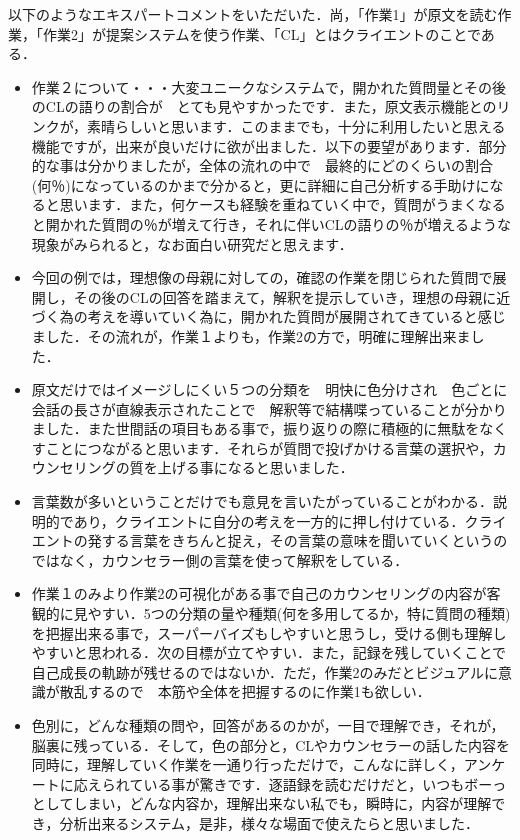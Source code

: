 \documentclass[shuuron]{kuee}
\begin{document}
以下のようなエキスパートコメントをいただいた．尚，「作業1」が原文を読む作業，「作業2」が提案システムを使う作業、「CL」とはクライエントのことである．
\begin{itemize}
  \item 作業２について・・・大変ユニークなシステムで，開かれた質問量とその後のCLの語りの割合が　とても見やすかったです．また，原文表示機能とのリンクが，素晴らしいと思います．このままでも，十分に利用したいと思える機能ですが，出来が良いだけに欲が出ました．以下の要望があります．部分的な事は分かりましたが，全体の流れの中で　最終的にどのくらいの割合(何％)になっているのかまで分かると，更に詳細に自己分析する手助けになると思います．また，何ケースも経験を重ねていく中で，質問がうまくなると開かれた質問の％が増えて行き，それに伴いCLの語りの％が増えるような現象がみられると，なお面白い研究だと思えます．

  \item 今回の例では，理想像の母親に対しての，確認の作業を閉じられた質問で展開し，その後のCLの回答を踏まえて，解釈を提示していき，理想の母親に近づく為の考えを導いていく為に，開かれた質問が展開されてきていると感じました．その流れが，作業１よりも，作業2の方で，明確に理解出来ました．
  \item 原文だけではイメージしにくい５つの分類を　明快に色分けされ　色ごとに会話の長さが直線表示されたことで　解釈等で結構喋っていることが分かりました．また世間話の項目もある事で，振り返りの際に積極的に無駄をなくすことにつながると思います．それらが質問で投げかける言葉の選択や，カウンセリングの質を上げる事になると思いました．

  \item 言葉数が多いということだけでも意見を言いたがっていることがわかる．説明的であり，クライエントに自分の考えを一方的に押し付けている．クライエントの発する言葉をきちんと捉え，その言葉の意味を聞いていくというのではなく，カウンセラー側の言葉を使って解釈をしている．
  \item 作業１のみより作業2の可視化がある事で自己のカウンセリングの内容が客観的に見やすい．5つの分類の量や種類(何を多用してるか，特に質問の種類)を把握出来る事で，スーパーバイズもしやすいと思うし，受ける側も理解しやすいと思われる．次の目標が立てやすい．また，記録を残していくことで自己成長の軌跡が残せるのではないか．ただ，作業2のみだとビジュアルに意識が散乱するので　本筋や全体を把握するのに作業1も欲しい．
  \item 色別に，どんな種類の問や，回答があるのかが，一目で理解でき，それが，脳裏に残っている．そして，色の部分と，CLやカウンセラーの話した内容を同時に，理解していく作業を一通り行っただけで，こんなに詳しく，アンケートに応えられている事が驚きです．逐語録を読むだけだと，いつもボーっとしてしまい，どんな内容か，理解出来ない私でも，瞬時に，内容が理解でき，分析出来るシステム，是非，様々な場面で使えたらと思いました．

\end{itemize}
\end{document}
